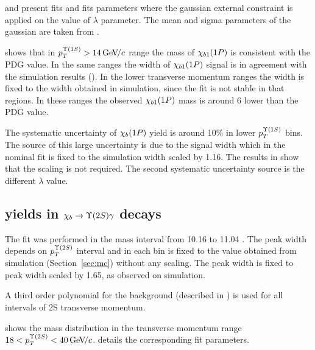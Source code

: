 

 and  present fits  and 
fits parameters where the gaussian external constraint is applied on  the value of $\lambda$ parameter.
The mean and sigma parameters of the gaussian are taken from .




 shows that in $p_T^{\Y1S} > 14 \gevc$ range the
mass of $\chi_{b 1}(1P)$ is consistent with the PDG value. In the same ranges the
width of $\chi_{b 1}(1P)$ signal is in agreement with the simulation results
(). In the lower transverse momentum ranges the
width is fixed to the width obtained in simulation, since the fit is not stable in that
regions. In these ranges the observed $\chi_{b 1}(1P)$ mass is around 6 \mevc lower than the
PDG value.



The systematic uncertainty of $\chi_{b}(1P)$ yield is around 10\% in lower
$p_T^{\Y1S}$ bins. The source of this large uncertainty is due to the signal
width which in the nominal fit is fixed to the simulation width scaled by 1.16. 
The results in  show that the scaling is not required. 
The second systematic uncertainty source is the different $\lambda$ value.

\subsection{\texorpdfstring{\chib}{xb} yields in
    \texorpdfstring{$\chib \to \Y2S \gamma$}{xb --> Y(2S) gamma} decays}
\label{sec:chib:ups2s:fit}

The fit was performed in the mass interval from 10.16 \gevcc to 11.04 \gevcc.
The  \chiboneTwoP peak width depends on $p_T^{\Y2S}$ interval and in each bin is fixed to
the value obtained from simulation (Section~\ref{sec:mc}) without any scaling.
The \chiboneThreeP peak width is fixed to \chiboneTwoP peak width scaled by
1.65, as observed on simulation. 


A third order polynomial for the background (described in ) is used 
for all intervals of \Y2S transverse momentum.


 shows the mass distribution in the transverse
momentum range $18 < p_T^{\TwoS} < 40 \gevc$. 
details the corresponding fit parameters.

